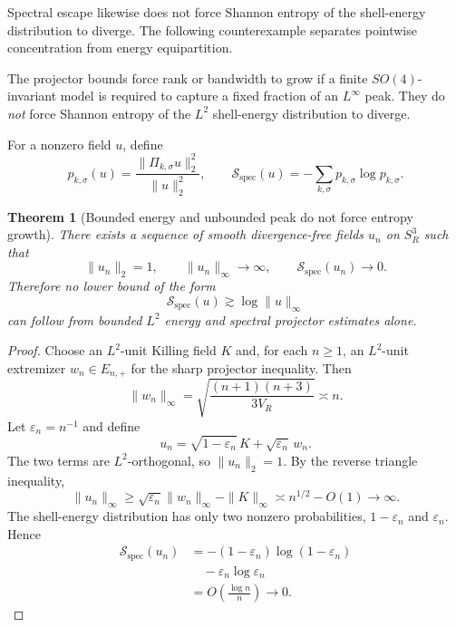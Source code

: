 \documentclass[
 aps,
 prd,
 reprint,
 amsmath,
 amssymb,
 nofootinbib,
 superscriptaddress
]{revtex4-2}
\newtheorem{theorem}{Theorem}[section]
\theoremstyle{definition}
\theoremstyle{remark}
\newcommand{\Sthree}{S^3_R}
\begin{document}
Spectral escape likewise does not force Shannon entropy of the shell-energy
distribution to diverge. The following counterexample separates pointwise
concentration from energy equipartition.
\label{sec:entropy}

The projector bounds force rank or bandwidth to grow if a finite
$SO(4)$-invariant model is required to capture a fixed fraction of an
$L^\infty$ peak.  They do \emph{not} force Shannon entropy of the
$L^2$ shell-energy distribution to diverge.

For a nonzero field $u$, define
\[
 p_{k,\sigma}(u)
 =
 \frac{\|\Pi_{k,\sigma}u\|_2^2}{\|u\|_2^2},
 \qquad
 \mathcal S_{\mathrm{spec}}(u)
 =
 -\sum_{k,\sigma}p_{k,\sigma}\log p_{k,\sigma}.
\]

\begin{theorem}[Bounded energy and unbounded peak do not force entropy growth]
\label{thm:entropycounter}
There exists a sequence of smooth divergence-free fields $u_n$ on
$\Sthree$ such that
\begin{equation}
 \|u_n\|_2=1,
 \qquad
 \|u_n\|_\infty\longrightarrow\infty,
 \qquad
 \boxed{
 \mathcal S_{\mathrm{spec}}(u_n)\longrightarrow0.
 }
 \label{eq:entropycounter}
\end{equation}
Therefore no lower bound of the form
\[
 \mathcal S_{\mathrm{spec}}(u)
 \gtrsim \log\|u\|_\infty
\]
can follow from bounded $L^2$ energy and spectral projector estimates alone.
\end{theorem}

\begin{proof}
Choose an $L^2$-unit Killing field $K$ and, for each $n\ge1$, an $L^2$-unit
extremizer $w_n\in E_{n,+}$ for the sharp projector inequality.  Then
\[
 \|w_n\|_\infty
 =
 \sqrt{\frac{(n+1)(n+3)}{3V_R}}
 \asymp n.
\]
Let $\varepsilon_n=n^{-1}$ and define
\[
 u_n=\sqrt{1-\varepsilon_n}\,K+\sqrt{\varepsilon_n}\,w_n.
\]
The two terms are $L^2$-orthogonal, so $\|u_n\|_2=1$.  By the reverse
triangle inequality,
\[
 \|u_n\|_\infty
 \ge
 \sqrt{\varepsilon_n}\|w_n\|_\infty-\|K\|_\infty
 \asymp n^{1/2}-O(1)\to\infty.
\]
The shell-energy distribution has only two nonzero probabilities,
$1-\varepsilon_n$ and $\varepsilon_n$.  Hence
\[
\begin{aligned}
 \mathcal S_{\mathrm{spec}}(u_n)
 &=
 -(1-\varepsilon_n)\log(1-\varepsilon_n)\\
 &\quad
 -\varepsilon_n\log\varepsilon_n\\
 &=
 O\!\left(\frac{\log n}{n}\right)\to0.
\end{aligned}
\]
\end{proof}
\end{document}
